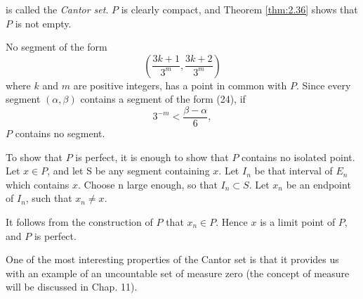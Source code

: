 is called the \emph{Cantor set}. $P$ is clearly compact, and Theorem \ref{thm:2.36} shows that $P$ is not empty.

No segment of the form
\begin{equation}
    \left(
        \frac{3k+1}{3^m},
        \frac{3k+2}{3^m}
    \right)
\end{equation}
where $k$ and $m$ are positive integers, has a point in common with $P$. Since every segment $(\alpha, \beta)$ contains a segment of the form (24), if
\begin{equation*}
    3^{-m} < \frac{\beta - \alpha}{6},
\end{equation*}
$P$ contains no segment.

To show that $P$ is perfect, it is enough to show that $P$ contains no isolated point. Let $x \in P$, and let S be any segment containing $x$. Let $I_n$ be that interval of $E_n$ which contains $x$. Choose n large enough, so that $I_n \subset S$. Let $x_n$ be an endpoint of $I_n$, such that $x_n \neq x$.

It follows from the construction of $P$ that $x_n \in P$. Hence $x$ is a limit point of $P$, and $P$ is perfect.

One of the most interesting properties of the Cantor set is that it provides
us with an example of an uncountable set of measure zero (the concept of
measure will be discussed in Chap. 11).
